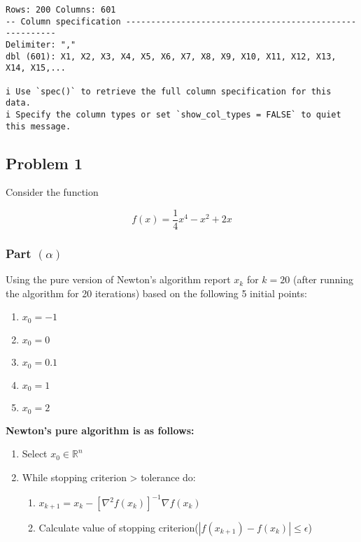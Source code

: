 \documentclass[
  letterpaper,
  DIV=11,
  numbers=noendperiod]{scrartcl}
\providecommand{\tightlist}{%
  \setlength{\itemsep}{0pt}\setlength{\parskip}{0pt}}\usepackage{longtable,booktabs,array}
\begin{document}
\begin{verbatim}
Rows: 200 Columns: 601
-- Column specification --------------------------------------------------------
Delimiter: ","
dbl (601): X1, X2, X3, X4, X5, X6, X7, X8, X9, X10, X11, X12, X13, X14, X15,...

i Use `spec()` to retrieve the full column specification for this data.
i Specify the column types or set `show_col_types = FALSE` to quiet this message.
\end{verbatim}

\newpage

\subsection{Problem 1}\label{problem-1}

Consider the function

\[
f(x) = \frac{1}{4} x^4 - x^2 + 2x
\]

\subsubsection{\texorpdfstring{Part
\((\alpha)\)}{Part (\textbackslash alpha)}}\label{part-alpha}

Using the pure version of Newton's algorithm report \(x_k\) for
\(k = 20\) (after running the algorithm for 20 iterations) based on the
following 5 initial points:

\begin{enumerate}
\def\labelenumi{\arabic{enumi}.}
\tightlist
\item
  \(x_0 = −1\)
\item
  \(x_0 = 0\)
\item
  \(x_0 = 0.1\)
\item
  \(x_0 = 1\)
\item
  \(x_0 = 2\)
\end{enumerate}

\textbf{Newton's pure algorithm is as follows:}

\begin{enumerate}
\def\labelenumi{\arabic{enumi}.}
\tightlist
\item
  Select \(x_0 \in \mathbb{R}^n\)
\item
  While stopping criterion \textgreater{} tolerance do:

  \begin{enumerate}
  \def\labelenumii{\arabic{enumii}.}
  \tightlist
  \item
    \(x_{k+1} = x_k - [\nabla^2f(x_k)]^{-1} \nabla f(x_k)\)
  \item
    Calculate value of stopping
    criterion(\(|f(x_{k+1}) - f(x_k)| \leq \epsilon\))
  \end{enumerate}
\end{enumerate}
\end{document}

